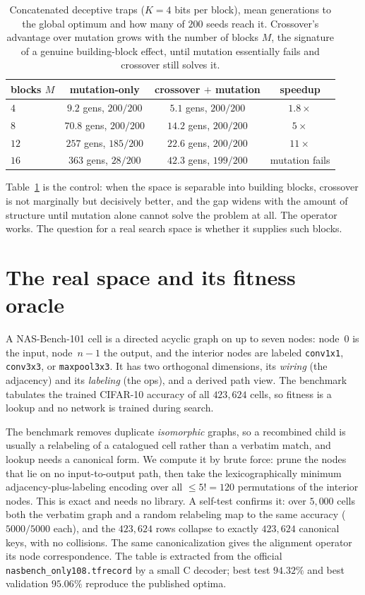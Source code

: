 \documentclass[11pt]{article}
\begin{document}
\begin{table}[t]
\centering
\caption{Concatenated deceptive traps ($K=4$ bits per block), mean generations to the global
optimum and how many of $200$ seeds reach it. Crossover's advantage over mutation grows with
the number of blocks $M$, the signature of a genuine building-block effect, until mutation
essentially fails and crossover still solves it.}
\label{tab:bb}
\begin{tabular}{lccc}
\toprule
blocks $M$ & mutation-only & crossover $+$ mutation & speedup \\
\midrule
$4$  & $9.2$ gens, $200/200$  & $5.1$ gens, $200/200$  & $1.8\times$ \\
$8$  & $70.8$ gens, $200/200$ & $14.2$ gens, $200/200$ & $5\times$ \\
$12$ & $257$ gens, $185/200$  & $22.6$ gens, $200/200$ & $11\times$ \\
$16$ & $363$ gens, \textbf{$28/200$} & $42.3$ gens, \textbf{$199/200$} & mutation fails \\
\bottomrule
\end{tabular}
\end{table}

Table~\ref{tab:bb} is the control: when the space is separable into building blocks, crossover
is not marginally but decisively better, and the gap widens with the amount of structure until
mutation alone cannot solve the problem at all. The operator works. The question for a real
search space is whether it supplies such blocks.

\section{The real space and its fitness oracle}

A NAS-Bench-101 cell is a directed acyclic graph on up to seven nodes: node~0 is the input,
node~$n{-}1$ the output, and the interior nodes are labeled
\texttt{conv1x1}, \texttt{conv3x3}, or \texttt{maxpool3x3}. It has two orthogonal dimensions,
its \emph{wiring} (the adjacency) and its \emph{labeling} (the ops), and a derived path view.
The benchmark \cite{nasbench101} tabulates the trained CIFAR-10 accuracy of all $423{,}624$
cells, so fitness is a lookup and no network is trained during search.

The benchmark removes duplicate \emph{isomorphic} graphs, so a recombined child is usually a
relabeling of a catalogued cell rather than a verbatim match, and lookup needs a canonical
form. We compute it by brute force: prune the nodes that lie on no input-to-output path, then
take the lexicographically minimum adjacency-plus-labeling encoding over all $\le5!=120$
permutations of the interior nodes. This is exact and needs no library. A self-test confirms
it: over $5{,}000$ cells both the verbatim graph and a random relabeling map to the same
accuracy ($5000/5000$ each), and the $423{,}624$ rows collapse to exactly $423{,}624$ canonical
keys, with no collisions. The same canonicalization gives the alignment operator its node
correspondence. The table is extracted from the official \texttt{nasbench\_only108.tfrecord} by
a small C decoder; best test $94.32\%$ and best validation $95.06\%$ reproduce the published
optima.
\end{document}
